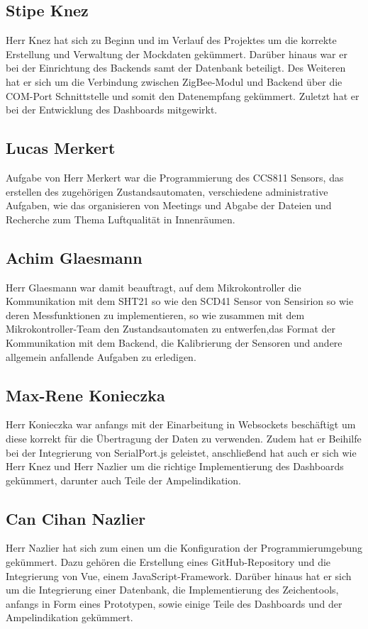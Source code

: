 \documentclass[]{article}
\begin{document}
		\subsection{Stipe Knez}
			Herr Knez hat sich zu Beginn und im Verlauf des Projektes um die korrekte Erstellung und Verwaltung der Mockdaten gekümmert. Darüber hinaus war er bei der Einrichtung des Backends samt der Datenbank beteiligt. Des Weiteren hat er sich um die Verbindung zwischen ZigBee-Modul und Backend über die COM-Port Schnittstelle und somit den Datenempfang gekümmert. Zuletzt hat er bei der Entwicklung des Dashboards mitgewirkt. 
		\subsection{Lucas Merkert}
			Aufgabe von Herr Merkert war die Programmierung des CCS811 Sensors, das erstellen des zugehörigen Zustandsautomaten, verschiedene administrative Aufgaben, wie das organisieren von Meetings und Abgabe der Dateien und Recherche zum Thema Luftqualität in Innenräumen.
		\subsection{Achim Glaesmann}
			Herr Glaesmann war damit beauftragt, auf dem Mikrokontroller die Kommunikation mit dem SHT21 so wie den SCD41 Sensor von Sensirion so wie deren Messfunktionen zu implementieren, so wie zusammen mit dem Mikrokontroller-Team den Zustandsautomaten zu entwerfen,das Format der Kommunikation mit dem Backend, die Kalibrierung der Sensoren und andere allgemein anfallende Aufgaben zu erledigen.
		\subsection{Max-Rene Konieczka}
			Herr Konieczka war anfangs mit der Einarbeitung in Websockets beschäftigt um diese korrekt für die Übertragung der Daten zu verwenden. Zudem hat er Beihilfe bei der Integrierung von SerialPort.js geleistet, anschließend hat auch er sich wie Herr Knez und Herr Nazlier um die richtige Implementierung des Dashboards gekümmert, darunter auch Teile der Ampelindikation. 
		\subsection{Can Cihan Nazlier}
			Herr Nazlier hat sich zum einen um die Konfiguration der Programmierumgebung gekümmert. Dazu gehören die Erstellung eines GitHub-Repository und die Integrierung von Vue, einem JavaScript-Framework. Darüber hinaus hat er sich um die Integrierung einer Datenbank, die Implementierung des Zeichentools, anfangs in Form eines Prototypen, sowie einige Teile des Dashboards und der Ampelindikation gekümmert.
			\newpage
		
\end{document}
